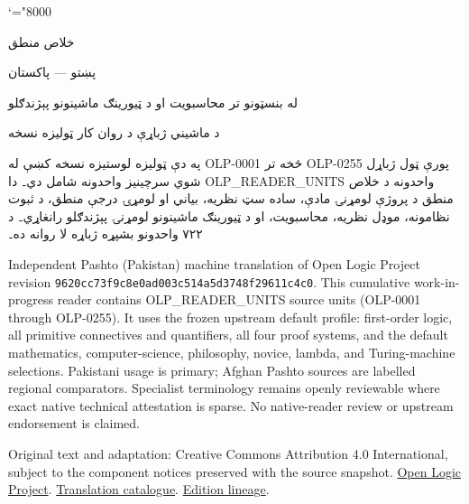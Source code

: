 \documentclass[11pt,a4paper,oneside]{report}
\theoremstyle{definition}
\begin{document}
\setRTL
\mathcode`\!="8000
\begin{titlepage}
\thispagestyle{empty}
\begin{center}
\vspace*{22mm}
{\Huge خلاص منطق}\par\bigskip
{\Large پښتو — پاکستان}\par\bigskip
{\LARGE له بنسټونو تر محاسبويت او د ټيورينګ ماشينونو پېژندګلو}\par\bigskip
د ماشيني ژباړې د روان کار ټوليزه نسخه
\end{center}
\bigskip
په دې ټوليزه لوستيزه نسخه کښې له OLP-0001 څخه تر OLP-0255 پورې
ټول ژباړل شوي سرچينيز واحدونه شامل دي۔ دا OLP_READER_UNITS واحدونه د
خلاص منطق د پروژې لومړنۍ مادې، ساده سټ نظريه، بياني او لومړۍ درجې
منطق، د ثبوت نظامونه، موډل نظريه، محاسبويت، او د ټيورينګ ماشينونو
لومړنۍ پېژندګلو رانغاړي۔ د ۷۲۲ واحدونو بشپړه ژباړه لا روانه ده۔

\begin{LTR}\latinfont\small
Independent Pashto (Pakistan) machine translation of Open Logic Project
revision \texttt{9620cc73f9c8e0ad003c514a5d3748f29611c4c0}. This cumulative
work-in-progress reader contains OLP_READER_UNITS source units (OLP-0001
through OLP-0255). It uses the frozen upstream default profile: first-order
logic, all primitive connectives and quantifiers, all four proof systems,
and the default mathematics, computer-science, philosophy, novice, lambda,
and Turing-machine selections. Pakistani usage is primary; Afghan Pashto
sources are labelled regional comparators. Specialist terminology remains
openly reviewable where exact native technical attestation is sparse. No
native-reader review or upstream endorsement is claimed.

Original text and adaptation: Creative Commons Attribution 4.0 International,
subject to the component notices preserved with the source snapshot.
\href{https://openlogicproject.org/}{Open Logic Project}.\quad
\href{https://github.com/KokunoYumeto/OpenLogic-translations}{Translation catalogue}.\quad
\href{https://doi.org/10.5281/zenodo.22307197}{Edition lineage}.
\end{LTR}
\end{titlepage}
\tableofcontents
\clearpage
\end{document}
